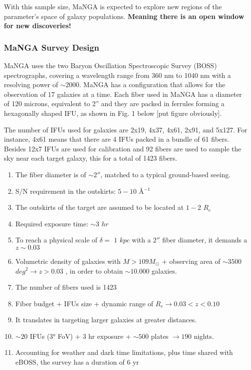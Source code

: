 With this sample size, MaNGA is expected to explore new regions of the parameter's space of galaxy populations. \textbf{Meaning there is an open window for new discoveries!}


\subsubsection{MaNGA Survey Design}

 MaNGA uses the two Baryon Oscillation Spectroscopic Survey (BOSS) spectrographs, covering a wavelength range from 360 nm to 1040 nm with a resolving power of $\sim 2000$. MaNGA has a configuration that allows for the observation of 17 galaxies at a time. Each fiber used in MaNGA has a diameter of 120 microns, equivalent to 2'' and they are packed in ferrules forming a hexagonally shaped IFU, as shown in Fig. 1 below [put figure obviously].

The number of IFUs used for galaxies are 2x19, 4x37, 4x61, 2x91, and 5x127. For instance, 4x61 means that there are 4 IFUs packed in a bundle of 61 fibers. Besides 12x7 IFUs are used for calibration and 92 fibers are used to sample the sky near each target galaxy, this for a total of 1423 fibers. 

\begin{enumerate}
  
  \item The fiber diameter is of $\sim 2''$, matched to a typical ground-based seeing.
  
  \item S/N requirement in the outskirts: $5-10$ \AA$^{-1}$
  
  \item The outskirts of the target are assumed to be located at $1-2$ $R_e$
  
  \item Required exposure time: $\sim 3$ $hr$

  \item To reach a physical scale of $\delta =$ $1$ $kpc$ with a $2''$ fiber diameter, it demands a $z \sim  0.03$
  
  \item Volumetric density of galaxies with $M > 109 M_{\odot}$ $+$ observing area of $\sim 3500$ $deg^2 \rightarrow z > 0.03$  , in order to obtain  $\sim 10.000$ galaxies.
  
  \item The number of fibers used is 1423
  
  \item Fiber budget + IFUs size + dynamic range of $R_e \rightarrow 0.03 < z < 0.10$
  
  \item It translates in targeting larger galaxies at greater distances.
  
  \item $ \sim 20$ IFUs ($3°$ FoV) + $3$ hr exposure + $ \sim 500$ plates $\rightarrow 190$ nights.
  
  \item Accounting for weather and dark time limitations, plus time shared with eBOSS, the survey has a duration of 6 yr
\end{enumerate}

